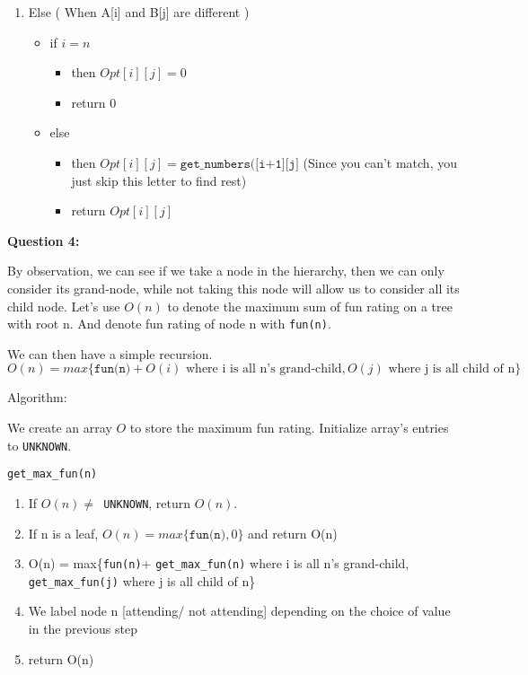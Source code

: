 \documentclass{article}
\begin{document}
\begin{enumerate}
\begin{itemize}
  \end{itemize}

\item Else ( When A[i] and B[j] are different )


  \begin{itemize}

  \item if $i=n$

    \begin{itemize}
    \item then $Opt[i][j] = 0$
    \item return 0
    \end{itemize}

  \item else

    \begin{itemize}
    \item then $Opt[i][j] = \texttt{get\_numbers([i+1][j]}$ (Since you can't match, you just skip this letter to find rest)
    \item return $Opt[i][j]$
    \end{itemize}

  \end{itemize}

\end{enumerate}


\textbf{Question 4:}\newline

By observation, we can see if we take a node in the hierarchy, then we can only consider its grand-node, while not taking this node will allow us to consider all its child node. Let's use $O(n)$ to denote the maximum sum of fun rating on a tree with root n. And denote fun rating of node n with \texttt{fun(n)}.

We can then have a simple recursion. $$O(n) = max\{\texttt{fun(n)}+ O(i) \text{ where i is all n's grand-child},  O(j) \text{ where j is all child of n}\}$$\pagebreak

Algorithm:

We create an array $O$ to store the maximum fun rating. Initialize array's entries to \texttt{UNKNOWN}.\newline

\texttt{get\_max\_fun(n)}
\begin{enumerate}
\item If $O(n) \neq $\texttt{ UNKNOWN}, return $O(n)$.
\item If n is a leaf, $O(n) = max\{\texttt{fun(n)}, 0\}$ and return O(n)
\item O(n) = max\{\texttt{fun(n)}+ \texttt{get\_max\_fun(n)} where i is all n's grand-child,  \texttt{get\_max\_fun(j)} where j is all child of n\}
\item We label node n [attending/ not attending] depending on the choice of value in the previous step
\item return O(n)
\end{enumerate}
\end{document}
